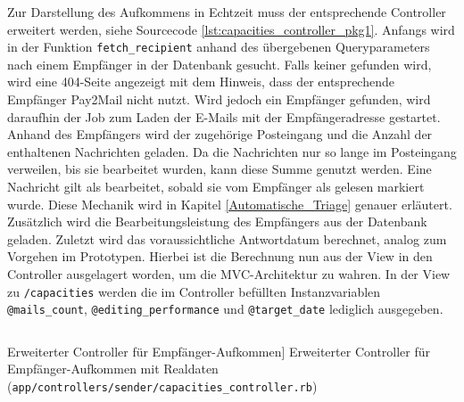 \noindent Zur Darstellung des Aufkommens in Echtzeit muss der entsprechende Controller erweitert werden, siehe Sourcecode \ref{lst:capacities_controller_pkg1}. Anfangs wird in der Funktion \texttt{fetch\_recipient} anhand des übergebenen Queryparameters nach einem Empfänger in der Datenbank gesucht. Falls keiner gefunden wird, wird eine 404-Seite angezeigt mit dem Hinweis, dass der entsprechende Empfänger Pay2Mail nicht nutzt. Wird jedoch ein Empfänger gefunden, wird daraufhin der Job zum Laden der E-Mails mit der Empfängeradresse gestartet. Anhand des Empfängers wird der zugehörige Posteingang und die Anzahl der enthaltenen Nachrichten geladen. Da die Nachrichten nur so lange im Posteingang verweilen, bis sie bearbeitet wurden, kann diese Summe genutzt werden. Eine Nachricht gilt als bearbeitet, sobald sie vom Empfänger als gelesen markiert wurde. Diese Mechanik wird in Kapitel \ref{Automatische_Triage} genauer erläutert. Zusätzlich wird die Bearbeitungsleistung des Empfängers aus der Datenbank geladen. Zuletzt wird das voraussichtliche Antwortdatum berechnet, analog zum Vorgehen im Prototypen. Hierbei ist die Berechnung nun aus der View in den Controller ausgelagert worden, um die MVC-Architektur zu wahren. In der View zu \texttt{/capacities} werden die im Controller befüllten Instanzvariablen \texttt{@mails\_count}, \texttt{@editing\_performance} und \texttt{@target\_date} lediglich ausgegeben.

\begin{listing}[!ht]
\inputminted[linenos]{ruby}{Listings/Pkg1/capacities_controller.rb}

\caption
    [Erweiterter Controller für Empfänger-Aufkommen]
    {Erweiterter Controller für Empfänger-Aufkommen mit Realdaten (\texttt{app/controllers/sender/capacities\_controller.rb})}

\label{lst:capacities_controller_pkg1}
\end{listing}


